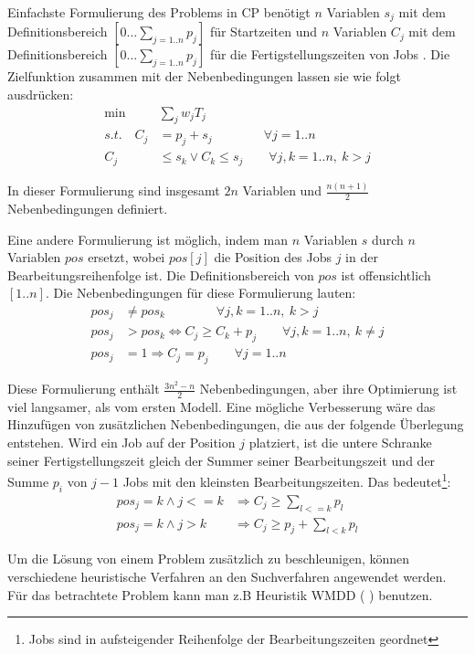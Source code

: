 Einfachste Formulierung des Problems in CP benötigt $n$ Variablen $s_j$ mit dem Definitionsbereich $[0\dots \sum_{j=1..n}p_j]$ für Startzeiten und $n$ Variablen $C_j$ mit dem Definitionsbereich $[0\dots \sum_{j=1..n}p_j]$ für die Fertigstellungszeiten von Jobs . Die Zielfunktion zusammen mit der Nebenbedingungen lassen sie wie folgt ausdrücken:
\begin{align}
 \min & \sum_{j}{w_jT_j} \nonumber \\
 s.t.\quad C_j & = p_j + s_j\qquad\qquad \forall j=1..n \nonumber \\
 C_j  & \le s_k \vee  C_k \le s_j \qquad \forall j,k=1..n,\ k>j \nonumber
\end{align}

In dieser Formulierung sind insgesamt $2n$ Variablen und $\frac{n(n+1)}{2}$ Nebenbedingungen definiert.

Eine andere Formulierung ist möglich, indem man $n$ Variablen $s$ durch $n$ Variablen $pos$ ersetzt, wobei $pos[j]$ die Position des Jobs $j$ in der Bearbeitungsreihenfolge ist. Die Definitionsbereich von $pos$ ist offensichtlich $[1..n]$. Die Nebenbedingungen für diese Formulierung lauten:
\begin{align}
 pos_j & \not= pos_k\qquad\qquad \forall j,k=1..n,\ k>j \nonumber \\
 pos_j  & > pos_k \Leftrightarrow  C_j \ge C_k + p_j \qquad \forall j,k=1..n,\ k\not=j \nonumber \\
 pos_j  & = 1 \Rightarrow C_j=p_j \qquad \forall j=1..n \nonumber
\end{align}

Diese Formulierung enthält  $\frac{3n^2-n}{2}$ Nebenbedingungen, aber ihre Optimierung ist viel langsamer, als vom ersten Modell. Eine mögliche Verbesserung wäre das Hinzufügen von zusätzlichen Nebenbedingungen, die aus der folgende Überlegung entstehen. Wird ein Job auf der Position $j$ platziert, ist die untere Schranke seiner Fertigstellungszeit gleich der Summer seiner Bearbeitungszeit und der Summe $p_i$ von $j-1$ Jobs mit den kleinsten Bearbeitungszeiten. Das bedeutet\footnote{Jobs sind in aufsteigender Reihenfolge der Bearbeitungszeiten geordnet}:
\begin{align}
  pos_j=k \wedge j<=k  & \Rightarrow C_j \ge \sum_{l<=k} p_l \nonumber \\
  pos_j=k \wedge j>k  & \Rightarrow C_j \ge p_j+\sum_{l<k} p_l \nonumber 
\end{align}

Um die Lösung von einem Problem zusätzlich zu beschleunigen, können verschiedene heuristische Verfahren an den Suchverfahren angewendet werden. Für das betrachtete Problem kann man z.B Heuristik WMDD ( \grqq)  \citep[siehe][]{WMDD} benutzen.

